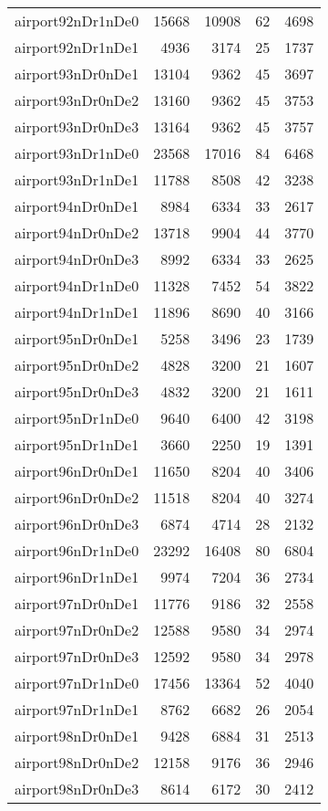 \begin{tabular}{lrrrr}
airport92nDr1nDe0 & 15668 & 10908 & 62 & 4698 \\
airport92nDr1nDe1 & 4936 & 3174 & 25 & 1737 \\
airport93nDr0nDe1 & 13104 & 9362 & 45 & 3697 \\
airport93nDr0nDe2 & 13160 & 9362 & 45 & 3753 \\
airport93nDr0nDe3 & 13164 & 9362 & 45 & 3757 \\
airport93nDr1nDe0 & 23568 & 17016 & 84 & 6468 \\
airport93nDr1nDe1 & 11788 & 8508 & 42 & 3238 \\
airport94nDr0nDe1 & 8984 & 6334 & 33 & 2617 \\
airport94nDr0nDe2 & 13718 & 9904 & 44 & 3770 \\
airport94nDr0nDe3 & 8992 & 6334 & 33 & 2625 \\
airport94nDr1nDe0 & 11328 & 7452 & 54 & 3822 \\
airport94nDr1nDe1 & 11896 & 8690 & 40 & 3166 \\
airport95nDr0nDe1 & 5258 & 3496 & 23 & 1739 \\
airport95nDr0nDe2 & 4828 & 3200 & 21 & 1607 \\
airport95nDr0nDe3 & 4832 & 3200 & 21 & 1611 \\
airport95nDr1nDe0 & 9640 & 6400 & 42 & 3198 \\
airport95nDr1nDe1 & 3660 & 2250 & 19 & 1391 \\
airport96nDr0nDe1 & 11650 & 8204 & 40 & 3406 \\
airport96nDr0nDe2 & 11518 & 8204 & 40 & 3274 \\
airport96nDr0nDe3 & 6874 & 4714 & 28 & 2132 \\
airport96nDr1nDe0 & 23292 & 16408 & 80 & 6804 \\
airport96nDr1nDe1 & 9974 & 7204 & 36 & 2734 \\
airport97nDr0nDe1 & 11776 & 9186 & 32 & 2558 \\
airport97nDr0nDe2 & 12588 & 9580 & 34 & 2974 \\
airport97nDr0nDe3 & 12592 & 9580 & 34 & 2978 \\
airport97nDr1nDe0 & 17456 & 13364 & 52 & 4040 \\
airport97nDr1nDe1 & 8762 & 6682 & 26 & 2054 \\
airport98nDr0nDe1 & 9428 & 6884 & 31 & 2513 \\
airport98nDr0nDe2 & 12158 & 9176 & 36 & 2946 \\
airport98nDr0nDe3 & 8614 & 6172 & 30 & 2412 \\

\end{tabular}
